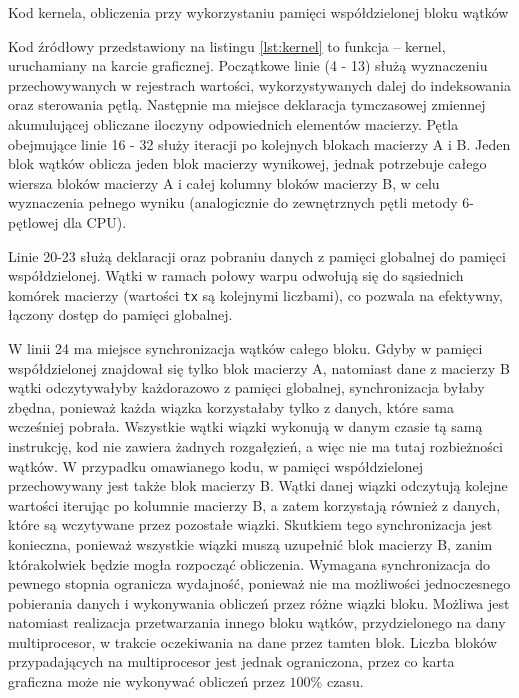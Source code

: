 \documentclass[12pt,a4paper]{article}
\begin{document}

\begin{listing}[H]
\inputminted{cuda}{listings/kernel.cu}
\caption{Kod kernela, obliczenia przy wykorzystaniu pamięci współdzielonej bloku wątków}
\label{lst:kernel}
\end{listing}

\newpage
Kod źródłowy przedstawiony na listingu \ref{lst:kernel} to funkcja -- kernel, uruchamiany na karcie graficznej. Początkowe linie (4 - 13) służą wyznaczeniu przechowywanych w rejestrach wartości, wykorzystywanych dalej do indeksowania oraz sterowania pętlą. Następnie ma miejsce deklaracja tymczasowej zmiennej akumulującej obliczane iloczyny odpowiednich elementów macierzy. Pętla obejmujące linie 16 - 32 służy iteracji po kolejnych blokach macierzy A i B. Jeden blok wątków oblicza jeden blok macierzy wynikowej, jednak potrzebuje całego wiersza bloków macierzy A i całej kolumny bloków macierzy B, w celu wyznaczenia pełnego wyniku (analogicznie do zewnętrznych pętli metody 6-pętlowej dla CPU).

Linie 20-23 służą deklaracji oraz pobraniu danych z pamięci globalnej do pamięci współdzielonej. Wątki w ramach połowy warpu odwołują się do sąsiednich komórek macierzy (wartości \verb|tx| są kolejnymi liczbami), co pozwala na efektywny, łączony dostęp do pamięci globalnej.

W linii 24 ma miejsce synchronizacja wątków całego bloku. Gdyby w pamięci współdzielonej znajdował się tylko blok macierzy A, natomiast dane z macierzy B wątki odczytywałyby każdorazowo z pamięci globalnej, synchronizacja byłaby zbędna, ponieważ każda wiązka korzystałaby tylko z danych, które sama wcześniej pobrała. Wszystkie wątki wiązki wykonują w danym czasie tą samą instrukcję, kod nie zawiera żadnych rozgałęzień, a więc nie ma tutaj rozbieżności wątków. W przypadku omawianego kodu, w pamięci współdzielonej przechowywany jest także blok macierzy B.
Wątki danej wiązki odczytują kolejne wartości iterując po kolumnie macierzy B, a zatem korzystają również z danych, które są wczytywane przez pozostałe wiązki. Skutkiem tego synchronizacja jest konieczna, ponieważ wszystkie wiązki muszą uzupełnić blok macierzy B, zanim którakolwiek będzie mogła rozpocząć obliczenia. Wymagana synchronizacja do pewnego stopnia ogranicza wydajność, ponieważ nie ma możliwości jednoczesnego pobierania danych i wykonywania obliczeń przez różne wiązki bloku. Możliwa jest natomiast realizacja przetwarzania innego bloku wątków, przydzielonego na dany multiprocesor, w trakcie oczekiwania na dane przez tamten blok. Liczba bloków przypadających na multiprocesor jest jednak ograniczona, przez co karta graficzna może nie wykonywać obliczeń przez $100\%$ czasu.
\end{document}
